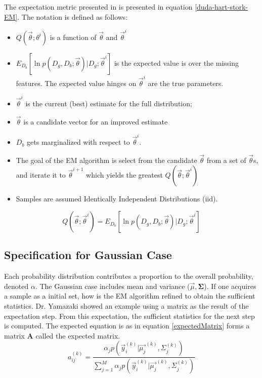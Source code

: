 \documentclass[12pt]{report}
\begin{document}
The expectation metric presented in \cite{duda-hart-stork} is presented in equation \ref{duda-hart-stork-EM}.  The notation is defined as follows:

\begin{itemize}
	\item $Q(\vec{\theta} ; \theta^i)$ is a function of $\vec{\theta}$ and $\vec{\theta}^i$
	\item $E_{D_b} [ \ln p(D_g, D_b; \vec{\theta}) | D_g ; \vec{\theta}^i ] $ is the expected value is over the missing features.  The expected value hinges on $\vec{\theta}^i$ are the true parameters.
	\item $\vec{\theta}^i$ is the current (best) estimate for the full distribution;  
	\item $\vec{\theta}$ is a candidate vector for an improved estimate 
	\item $D_b$ gets marginalized with respect to $\vec{\theta}^i$.
	\item The goal of the EM algorithm is select from the candidate $\vec{\theta}$ from a set of $\vec{\theta}$s, and iterate it to $\vec{\theta}^{i+1}$ which yields the greatest $Q(\vec{\theta} ; \vec{\theta}^i)$
	\item Samples are assumed Identically Independent Distributions (iid).  
\end{itemize}


\begin{equation}
Q( \vec{\theta} ; \vec{\theta}^i) = E_{D_b} [ \ln p(D_g, D_b; \vec{\theta}) | D_g ; \vec{\theta}^i ] \label{duda-hart-stork-EM}
\end{equation}


\subsection{Specification for Gaussian Case}
Each probability distribution contributes a proportion to the overall probability, denoted $\alpha$.  The Gaussian case includes mean and variance ($\vec{\mu}, \mathbf{\Sigma}$).  
If one acquires a sample as a initial set, how is the EM algorithm refined to obtain the sufficient statistics.   %
Dr. Yamazaki showed
an example using a matrix as the result of the expectation step\cite{yamazaki98introduction}.  From this expectation, the sufficient statistics for the next step is computed.   The expected equation is as in equation \ref{expectedMatrix} forms a matrix $\mathbf{A}$ called the expected matrix.
\begin{equation}
a_{ij}^{(k)}     = \frac {\alpha_j p(\vec{y}_i  ^{(k)}  | \vec{\mu_j} ^{(k)} , \Sigma_j ^{(k)}  )}{\sum_{j=1}^M \alpha_j p(\vec{y}_i  ^{(k)}  | \vec{\mu_j} ^{(k)} , \Sigma_j ^{(k)}  )} \label{expectedMatrix}
\end{equation}
\end{document}
